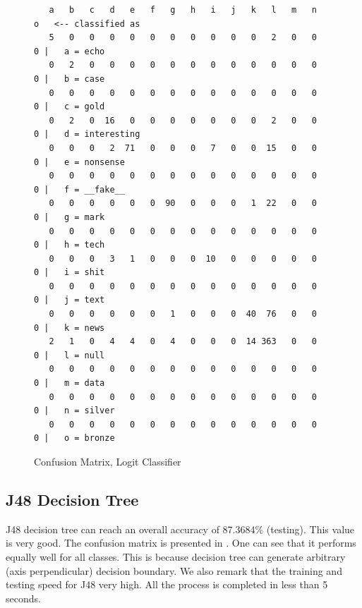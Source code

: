 \documentclass{sig-alternate}
\begin{document}
\begin{figure}[t!]
	\centering
\begin{Verbatim}
   a   b   c   d   e   f   g   h   i   j   k   l   m   n   o   <-- classified as
   5   0   0   0   0   0   0   0   0   0   0   2   0   0   0 |   a = echo
   0   2   0   0   0   0   0   0   0   0   0   0   0   0   0 |   b = case
   0   0   0   0   0   0   0   0   0   0   0   0   0   0   0 |   c = gold
   0   2   0  16   0   0   0   0   0   0   0   2   0   0   0 |   d = interesting
   0   0   0   2  71   0   0   0   7   0   0  15   0   0   0 |   e = nonsense
   0   0   0   0   0   0   0   0   0   0   0   0   0   0   0 |   f = __fake__
   0   0   0   0   0   0  90   0   0   0   1  22   0   0   0 |   g = mark
   0   0   0   0   0   0   0   0   0   0   0   0   0   0   0 |   h = tech
   0   0   0   3   1   0   0   0  10   0   0   0   0   0   0 |   i = shit
   0   0   0   0   0   0   0   0   0   0   0   0   0   0   0 |   j = text
   0   0   0   0   0   0   1   0   0   0  40  76   0   0   0 |   k = news
   2   1   0   4   4   0   4   0   0   0  14 363   0   0   0 |   l = null
   0   0   0   0   0   0   0   0   0   0   0   0   0   0   0 |   m = data
   0   0   0   0   0   0   0   0   0   0   0   0   0   0   0 |   n = silver
   0   0   0   0   0   0   0   0   0   0   0   0   0   0   0 |   o = bronze
\end{Verbatim}
	\caption{Confusion Matrix, Logit Classifier}
	\label{fig:confmat_logit}
\end{figure}

\subsection{J48 Decision Tree}
\label{sec:J48 Decision Tree}

J48 decision tree can reach an overall accuracy of 87.3684\% (testing). 
This value is very good. 
The confusion matrix is presented in \rfig{\ref{fig:confmat_j48}}. 
One can see that it performs equally well for all classes. 
This is because decision tree can generate arbitrary 
(axis perpendicular) decision boundary. 
We also remark that the training and testing speed for J48 very high. 
All the process is completed in less than 5 seconds. 
\end{document}
